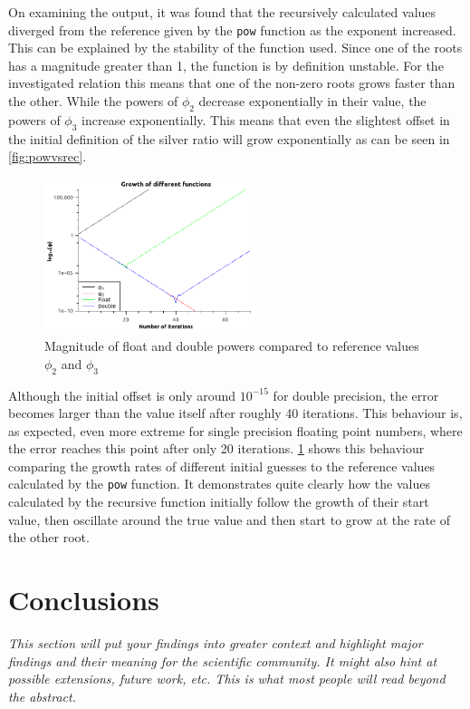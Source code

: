 \documentclass[letterpaper,12pt]{article}
\begin{document}
	On examining the output, it was found that the recursively calculated values diverged from the reference given by the \texttt{pow} function as the exponent increased. This can be explained by the stability of the function used. Since one of the roots has a magnitude greater than 1, the function is by definition unstable. For the investigated relation this means that one of the non-zero roots grows faster than the other. While the powers of $\phi_2$ decrease exponentially in their value, the powers of $\phi_3$ increase exponentially. This means that even the slightest offset in the initial definition of the silver ratio will grow exponentially as can be seen in \cref{fig:powvsrec}. \\
	
	\begin{figure}[h]
		\centering
		\includegraphics[width=0.55\textwidth]{growth.png}
		\caption{Magnitude of float and double powers compared to reference values $\phi_2$ and $\phi_3$}
		\label{fig:growth}
	\end{figure}
	
	Although the initial offset is only around $10^{-15}$ for double precision, the error becomes larger than the value itself after roughly 40 iterations. This behaviour is, as expected, even more extreme for single precision floating point numbers, where the error reaches this point after only 20 iterations. \cref{fig:growth} shows this behaviour comparing the growth rates of different initial guesses to the reference values calculated by the \texttt{pow} function.
	It demonstrates quite clearly how the values calculated by the recursive function initially follow the growth of their start value, then oscillate around the true value and then start to grow at the rate of the other root.
	
	
	\section{Conclusions}
		\textit{This section will put your findings into greater context and highlight major findings and their meaning for the scientific community. It might also hint at possible extensions, future work, etc. This is what most people will read beyond the abstract.}
	
\end{document}

